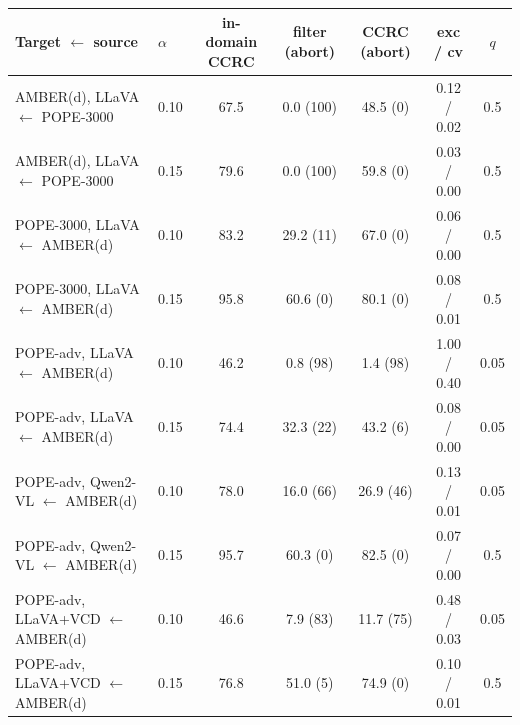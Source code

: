 \begin{tabular}{llccccc}
\toprule
Target $\leftarrow$ source & $\alpha$ & in-domain CCRC & filter (abort) & CCRC (abort) & exc / cv & $q$\\
\midrule
AMBER(d), LLaVA $\leftarrow$ POPE-3000 & 0.10 & 67.5 & 0.0 (100) & 48.5 (0) & 0.12 / 0.02 & 0.5\\
AMBER(d), LLaVA $\leftarrow$ POPE-3000 & 0.15 & 79.6 & 0.0 (100) & 59.8 (0) & 0.03 / 0.00 & 0.5\\
POPE-3000, LLaVA $\leftarrow$ AMBER(d) & 0.10 & 83.2 & 29.2 (11) & 67.0 (0) & 0.06 / 0.00 & 0.5\\
POPE-3000, LLaVA $\leftarrow$ AMBER(d) & 0.15 & 95.8 & 60.6 (0) & 80.1 (0) & 0.08 / 0.01 & 0.5\\
POPE-adv, LLaVA $\leftarrow$ AMBER(d) & 0.10 & 46.2 & 0.8 (98) & 1.4 (98) & 1.00 / 0.40 & 0.05\\
POPE-adv, LLaVA $\leftarrow$ AMBER(d) & 0.15 & 74.4 & 32.3 (22) & 43.2 (6) & 0.08 / 0.00 & 0.05\\
POPE-adv, Qwen2-VL $\leftarrow$ AMBER(d) & 0.10 & 78.0 & 16.0 (66) & 26.9 (46) & 0.13 / 0.01 & 0.05\\
POPE-adv, Qwen2-VL $\leftarrow$ AMBER(d) & 0.15 & 95.7 & 60.3 (0) & 82.5 (0) & 0.07 / 0.00 & 0.5\\
POPE-adv, LLaVA+VCD $\leftarrow$ AMBER(d) & 0.10 & 46.6 & 7.9 (83) & 11.7 (75) & 0.48 / 0.03 & 0.05\\
POPE-adv, LLaVA+VCD $\leftarrow$ AMBER(d) & 0.15 & 76.8 & 51.0 (5) & 74.9 (0) & 0.10 / 0.01 & 0.5\\
\bottomrule
\end{tabular}
